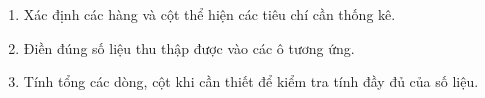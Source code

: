 \begin{enumerate}
\item Xác định các hàng và cột thể hiện các tiêu chí cần thống kê.
\item Điền đúng số liệu thu thập được vào các ô tương ứng.
\item Tính tổng các dòng, cột khi cần thiết để kiểm tra tính đầy đủ của số liệu.
\end{enumerate}
